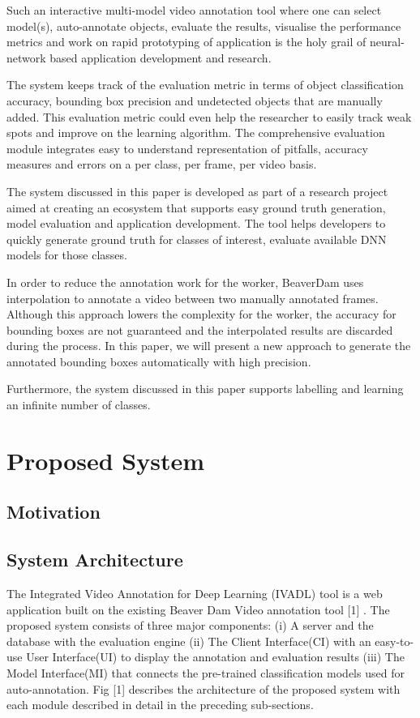 \documentclass[conference]{IEEEtran}
\begin{document}
Such an interactive multi-model video annotation tool where one can select model(s), auto-annotate objects, evaluate the results, visualise the performance metrics and work on rapid prototyping of application is the holy grail of neural-network based application development and research.\par
The system keeps track of the evaluation metric in terms of object classification accuracy, bounding box precision and undetected objects that are manually added. This evaluation metric could even help the researcher to easily track weak spots and improve on the learning algorithm. The comprehensive evaluation module integrates easy to understand representation of pitfalls, accuracy measures and errors on a per class, per frame, per video basis. \par
The system discussed in this paper is developed as part of a research project aimed at creating an ecosystem that supports easy ground truth generation, model evaluation and application development. The tool helps developers to quickly generate ground truth for classes of interest, evaluate available DNN models for those classes. \par
In order to reduce the annotation work for the worker, BeaverDam uses interpolation to annotate a video between two manually annotated frames. Although this approach lowers the complexity for the worker, the accuracy for bounding boxes are not guaranteed and the interpolated results are discarded during the process. In this paper, we will present a new approach to generate the annotated bounding boxes automatically with high precision.\par
Furthermore, the system discussed in this paper supports labelling and learning an infinite number of classes.  \par

\section{Proposed System}\label{sec.overview}

\subsection{Motivation}

\subsection{System Architecture}
The Integrated Video Annotation for Deep Learning (IVADL) tool is a web application built on the existing Beaver Dam Video annotation tool [1] . The proposed system consists of three major components: (i) A server and the database with the evaluation engine (ii) The Client Interface(CI) with an easy-to-use User Interface(UI) to display the annotation and evaluation results (iii) The Model Interface(MI) that connects the pre-trained classification models used for auto-annotation. Fig [1]  describes the architecture of the proposed system with each module described in detail in the preceding sub-sections. 
\end{document}
